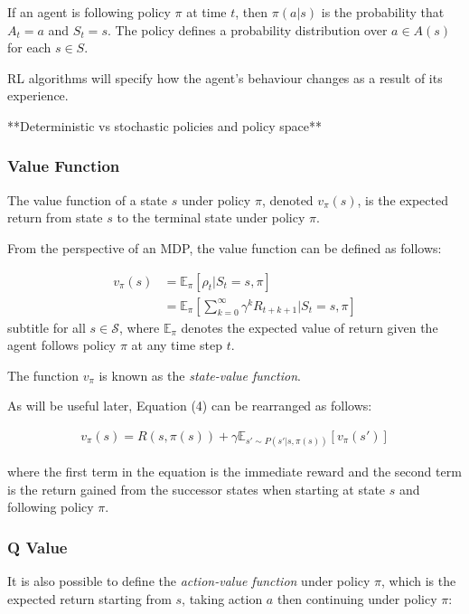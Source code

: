 \documentclass{article}
\begin{document}
If an agent is following policy $\pi$ at time $t$, then $\pi(a|s)$ is the probability that $A_t = a$ and $S_t = s$. The policy defines a probability distribution over $a \in A(s)$ for each $s \in S$. 

RL algorithms will specify how the agent's behaviour changes as a result of its experience.

**Deterministic vs stochastic policies and policy space**

\subsubsection{Value Function}

The value function of a state $s$ under policy $\pi$, denoted $v_\pi(s)$, is the expected return from state $s$ to the terminal state under policy $\pi$.

From the perspective of an MDP, the value function can be defined as follows\cite{RLNotes}\cite{Sutton1998}: 

\begin{align}
    v_\pi(s) &= \mathbb{E}_\pi [\rho_t | S_t = s, \pi]  \nonumber\\
             &= \mathbb{E}_\pi \left[\sum_{k=0}^{\infty} \gamma ^k R_{t+k+1}| S_t = s, \pi\right]
\end{align}subtitle
for all $s \in \mathcal{S}$, where $\mathbb{E}_\pi$ denotes the expected value of return given the agent follows policy $\pi$ at any time step $t$. 

The function $v_\pi$ is known as the \textit{state-value function}.

As will be useful later, Equation (4) can be rearranged as follows\cite{UCBSlides}: 

\begin{align}
    v_\pi(s) = R(s, \pi(s)) + \gamma \mathbb{E}_{s' \sim P(s'|s, \pi(s))} \left[ v_\pi(s')\right]
\end{align}

where the first term in the equation is the immediate reward and the second term is the return gained from the successor states when starting at state $s$ and following policy $\pi$.

\subsubsection{Q Value}

It is also possible to define the \textit{action-value function} under policy $\pi$, which is the expected return starting from $s$, taking action $a$ then continuing under policy $\pi$\cite{RLNotes}\cite{Sutton1998}:
\end{document}
